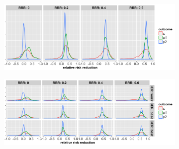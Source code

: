\documentclass[]{article}
\begin{document}
\begin{figure}
\centering
  \caption{Distribution of relative risk reduction estimates after stopping early for superiority of (a) B.I. or (b)
  L.P. Results are presented for the control event rate (rows, BEST CASE ONLY for B.I?), four relative risk reductions (by columns) and the three outcomes (legend).}
  \begin{subfigure}{0.8\textwidth}
    \centering
    \caption{}
    \includegraphics{../plots/3arm/RRRhat_supbi_3arm.png}
  \end{subfigure}
  \bigbreak
  \begin{subfigure}{0.8\textwidth}
    \centering
    \caption{}
    \includegraphics{../plots/3arm/RRRhat_suplp_3arm.png}
  \end{subfigure}
\end{figure}
\end{document}
